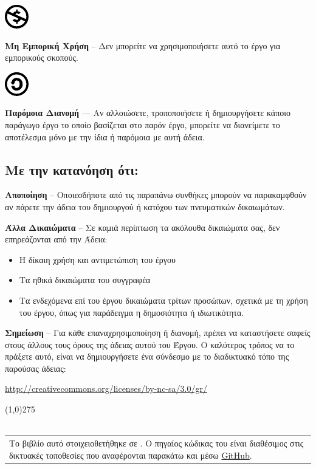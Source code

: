 \vspace{1em}
\noindent
\parbox{1.5cm}{\includegraphics[scale=0.15]{images/license/cc_nc_30}}
\parbox{10.5cm}{\textbf{Μη Εμπορική Χρήση} --  Δεν μπορείτε να χρησιμοποιήσετε αυτό το έργο για εμπορικούς σκοπούς.}

\vspace{1em}
\noindent
\parbox{1.5cm}{\includegraphics[scale=0.15]{images/license/cc_sa_30}}
\parbox{10.5cm}{\textbf{Παρόμοια Διανομή}  — Αν αλλοιώσετε, τροποποιήσετε ή δημιουργήσετε κάποιο παράγωγο έργο το οποίο βασίζεται στο παρόν έργο, μπορείτε να διανείμετε το αποτέλεσμα μόνο με την ίδια ή παρόμοια με αυτή άδεια.}

\subsection*{Με την κατανόηση ότι:}

\noindent
\textbf{Αποποίηση} -- Οποιεσδήποτε από τις παραπάνω συνθήκες μπορούν να παρακαμφθούν αν πάρετε την άδεια του δημιουργού ή κατόχου των πνευματικών δικαιωμάτων.

\vspace{1em}
\noindent
\textbf{Άλλα Δικαιώματα} -- Σε καμιά περίπτωση τα ακόλουθα δικαιώματα σας, δεν επηρεάζονται από την Άδεια:

\begin{itemize}
  \item Η δίκαιη χρήση και αντιμετώπιση του έργου
  \item Τα ηθικά δικαιώματα του συγγραφέα
  \item Τα ενδεχόμενα επί του έργου δικαιώματα τρίτων προσώπων, σχετικά με τη χρήση του έργου, όπως για παράδειγμα η δημοσιότητα ή ιδιωτικότητα.
\end{itemize}

\vspace{1em}
\noindent
\textbf{Σημείωση} -- Για κάθε επαναχρησιμοποίηση ή διανομή, πρέπει να καταστήσετε σαφείς στους άλλους τους όρους της άδειας αυτού του Έργου. Ο καλύτερος τρόπος να το πράξετε αυτό, είναι να δημιουργήσετε ένα σύνδεσμο με το διαδικτυακό τόπο της παρούσας άδειας:
\begin{center}
\url{http://creativecommons.org/licenses/by-nc-sa/3.0/gr/}
\end{center}
\line(1,0){275}\\\\
\begin{tabular}{p{}}
Το βιβλίο αυτό στοιχειοθετήθηκε σε \XeLaTeX{}.  Ο πηγαίος κώδικας του είναι διαθέσιμος στις δικτυακές τοποθεσίες που αναφέρονται παρακάτω και μέσω \href{https://github.com/sonic2000gr/diktia}{GitHub}.\\
\end{tabular}

